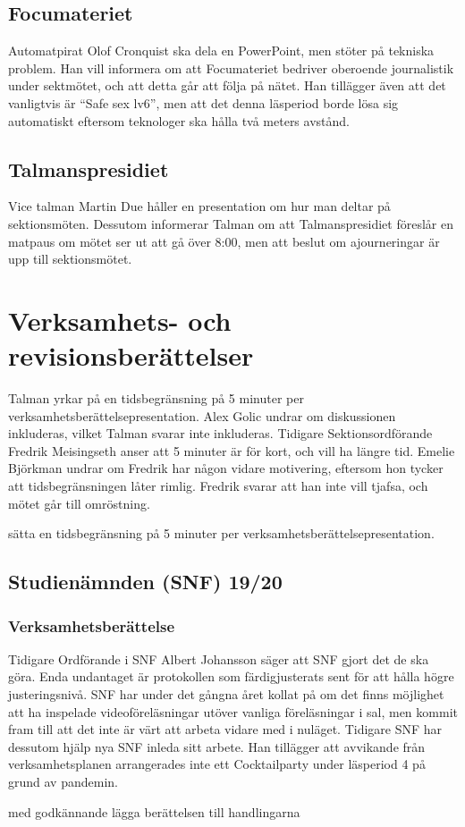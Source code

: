 \documentclass[hidelinks]{../sektionsmote} %
\begin{document}
\subsection{Focumateriet}
Automatpirat Olof Cronquist ska dela en PowerPoint, men stöter på tekniska problem.
Han vill informera om att Focumateriet bedriver oberoende journalistik under sektmötet, och att detta går att följa på nätet.
Han tillägger även att det vanligtvis är \enquote{Safe sex lv6}, men att det denna läsperiod borde lösa sig automatiskt eftersom teknologer ska hålla två meters avstånd.

\subsection{Talmanspresidiet}
Vice talman Martin Due håller en presentation om hur man deltar på sektionsmöten.
Dessutom informerar Talman om att Talmanspresidiet föreslår en matpaus om mötet ser ut att gå över 8:00, men att beslut om ajourneringar är upp till sektionsmötet.


\section{Verksamhets- och revisionsberättelser}
Talman yrkar på en tidsbegränsning på 5 minuter per verksamhetsberättelsepresentation.
Alex Golic undrar om diskussionen inkluderas, vilket Talman svarar inte inkluderas.
Tidigare Sektionsordförande Fredrik Meisingseth anser att 5 minuter är för kort, och vill ha längre tid.
Emelie Björkman undrar om Fredrik har någon vidare motivering, eftersom hon tycker att tidsbegränsningen låter rimlig.
Fredrik svarar att han inte vill tjafsa, och mötet går till omröstning.
\begin{beslut}
    \item sätta en tidsbegränsning på 5 minuter per verksamhetsberättelsepresentation.
\end{beslut}

\subsection{Studienämnden (SNF) 19/20}

\subsubsection{Verksamhetsberättelse}
Tidigare Ordförande i SNF Albert Johansson säger att SNF gjort det de ska göra.
Enda undantaget är protokollen som färdigjusterats sent för att hålla högre justeringsnivå.
SNF har under det gångna året kollat på om det finns möjlighet att ha inspelade videoföreläsningar utöver vanliga föreläsningar i sal, men kommit fram till att det inte är värt att arbeta vidare med i nuläget.
Tidigare SNF har dessutom hjälp nya SNF inleda sitt arbete.
Han tillägger att avvikande från verksamhetsplanen arrangerades inte ett Cocktailparty under läsperiod 4 på grund av pandemin.
\begin{beslut}
    \item med godkännande lägga berättelsen till handlingarna
\end{beslut}
\end{document}
